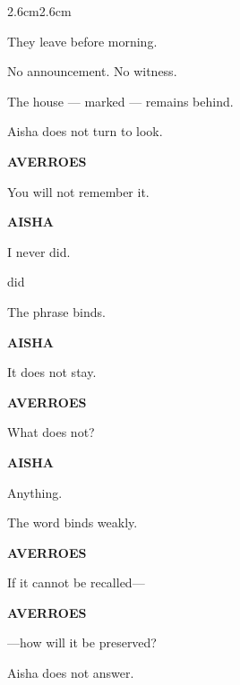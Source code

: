 \begin{adjustwidth}{2.6cm}{2.6cm}

They leave before morning.

\medskip

No announcement. No witness.

\medskip

The house --- marked --- remains behind.

\medskip

Aisha does not turn to look.

\vspace{2em}

\textbf{AVERROES}

You will not remember it.

\medskip

\textbf{AISHA}

I never did.

\medskip

 did

\medskip

The phrase binds.

\medskip


\vspace{2em}

\textbf{AISHA}

It does not stay.

\medskip

\textbf{AVERROES}

What does not?

\medskip

\textbf{AISHA}

Anything.

\medskip


\medskip

The word binds weakly.

\vspace{2em}

\textbf{AVERROES}

If it cannot be recalled---

\medskip

\textbf{AVERROES}

---how will it be preserved?

\medskip

Aisha does not answer.


\end{adjustwidth}
